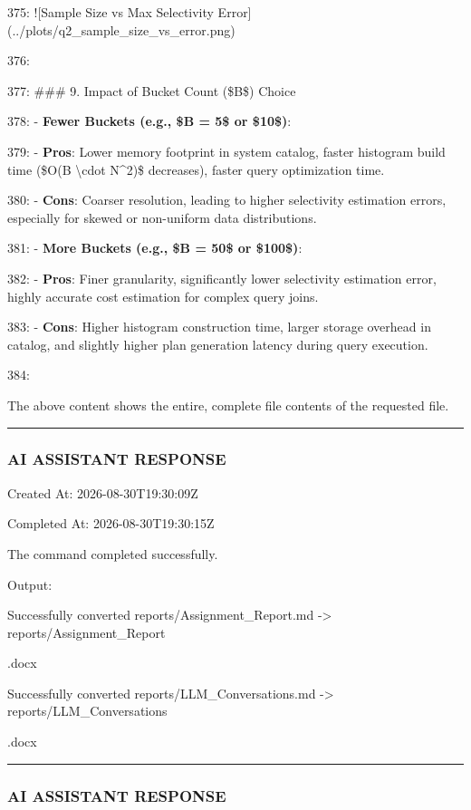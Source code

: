 \documentclass[11pt,a4paper]{article}
\begin{document}
{375: ![Sample Size vs Max Selectivity Error](../plots/q2\_sample\_size\_vs\_error.png)

376:

377: \#\#\# 9. Impact of Bucket Count (\$B\$) Choice

378: - \textbf{Fewer Buckets (e.g., \$B = 5\$ or \$10\$)}:

379:   - \textbf{Pros}: Lower memory footprint in system catalog, faster histogram build time (\$O(B \textbackslash{}cdot N\textasciicircum{}2)\$ decreases), faster query optimization time.

380:   - \textbf{Cons}: Coarser resolution, leading to higher selectivity estimation errors, especially for skewed or non-uniform data distributions.

381: - \textbf{More Buckets (e.g., \$B = 50\$ or \$100\$)}:

382:   - \textbf{Pros}: Finer granularity, significantly lower selectivity estimation error, highly accurate cost estimation for complex query joins.

383:   - \textbf{Cons}: Higher histogram construction time, larger storage overhead in catalog, and slightly higher plan generation latency during query execution.

384:

The above content shows the entire, complete file contents of the requested file.


\hrule

\subsubsection{AI ASSISTANT RESPONSE}

Created At: 2026-08-30T19:30:09Z

Completed At: 2026-08-30T19:30:15Z


The command completed successfully.

Output:

Successfully converted reports/Assignment\_Report.md -> reports/Assignment\_Report

.docx

Successfully converted reports/LLM\_Conversations.md -> reports/LLM\_Conversations

.docx


\hrule

\subsubsection{AI ASSISTANT RESPONSE}

}
\end{document}
